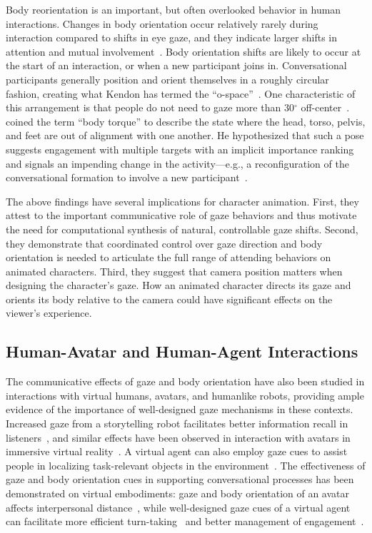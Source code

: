 Body reorientation is an important, but often overlooked behavior in human interactions. Changes in body orientation occur relatively rarely during interaction compared to shifts in eye gaze, and they indicate larger shifts in attention and mutual involvement~\citep{kendon1990conducting,schegloff1998bodytorque}.
Body orientation shifts are likely to occur at the start of an interaction, or when a new participant joins in. Conversational participants generally position and orient themselves in a roughly circular fashion, creating what Kendon has termed the ``o-space''~\citep{kendon1990conducting}. One characteristic of this arrangement is that people do not need to gaze more than 30$^{\circ}$ off-center~\citep{kendon1990conducting}. \citet{schegloff1998bodytorque} coined the term ``body torque'' to describe the state where the head, torso, pelvis, and feet are out of alignment with one another. He hypothesized that such a pose suggests engagement with multiple targets with an implicit importance ranking and signals an impending change in the activity---e.g., a reconfiguration of the conversational formation to involve a new participant~\citep{kendon1990conducting}.

The above findings have several implications for character animation. First, they attest to the important communicative role of gaze behaviors and thus motivate the need for computational synthesis of natural, controllable gaze shifts. Second, they demonstrate that coordinated control over gaze direction and body orientation is needed to articulate the full range of attending behaviors on animated characters. Third, they suggest that camera position matters when designing the character's gaze. How an animated character directs its gaze and orients its body relative to the camera could have significant effects on the viewer's experience.

\subsection{Human-Avatar and Human-Agent Interactions}

The communicative effects of gaze and body orientation have also been studied in interactions with virtual humans, avatars, and humanlike robots, providing ample evidence of the importance of well-designed gaze mechanisms in these contexts. Increased gaze from a storytelling robot facilitates better information recall in listeners~\citep{mutlu2006storytelling}, and similar effects have been observed in interaction with avatars in immersive virtual reality~\citep{bailenson2005transformed}. A virtual agent can also employ gaze cues to assist people in localizing task-relevant objects in the environment~\citep{bailly2010gaze}. The effectiveness of gaze and body orientation cues in supporting conversational processes has been demonstrated on virtual embodiments: gaze and body orientation of an avatar affects interpersonal distance~\citep{bailenson2003interpersonal}, while well-designed gaze cues of a virtual agent can facilitate more efficient turn-taking~\citep{heylen2005experimenting,andrist2013aversion,bohus2011multiparty} and better management of engagement~\citep{bohus2009models}.


